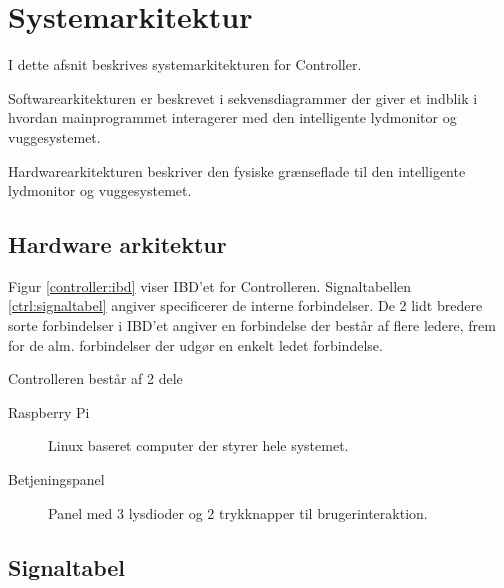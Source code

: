 \section{Systemarkitektur}

I dette afsnit beskrives systemarkitekturen for Controller.

Softwarearkitekturen er beskrevet i sekvensdiagrammer der giver et indblik i hvordan mainprogrammet interagerer med den intelligente lydmonitor og vuggesystemet.

Hardwarearkitekturen beskriver den fysiske grænseflade til den intelligente lydmonitor og vuggesystemet.



\subsection{Hardware arkitektur}


Figur \ref{controller:ibd} viser IBD'et for Controlleren. Signaltabellen \ref{ctrl:signaltabel} angiver specificerer de interne forbindelser. De 2 lidt bredere sorte forbindelser i IBD'et angiver en forbindelse der består af flere ledere, frem for de alm. forbindelser der udgør en enkelt ledet forbindelse. 

Controlleren består af 2 dele
\begin{description}
\item[Raspberry Pi] Linux baseret computer der styrer hele systemet. 
\item[Betjeningspanel] Panel med 3 lysdioder og 2 trykknapper til brugerinteraktion.
\end{description}

\subsection{Signaltabel}

